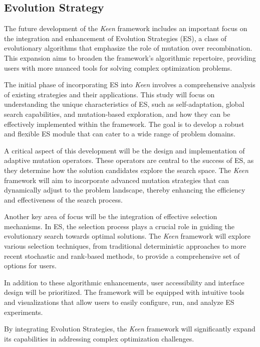     \subsection{Evolution Strategy}
    \label{sec:future:es}
        The future development of the \textit{Keen} framework includes an important focus on the integration and 
        enhancement of Evolution Strategies (ES), a class of evolutionary algorithms that emphasize the role of mutation 
        over recombination. This expansion aims to broaden the framework's algorithmic repertoire, providing users with 
        more nuanced tools for solving complex optimization problems.

        The initial phase of incorporating ES into \textit{Keen} involves a comprehensive analysis of existing 
        strategies and their applications. This study will focus on understanding the unique characteristics of ES, such 
        as self-adaptation, global search capabilities, and mutation-based exploration, and how they can be effectively 
        implemented within the framework. The goal is to develop a robust and flexible ES module that can cater to a 
        wide range of problem domains.

        A critical aspect of this development will be the design and implementation of adaptive mutation operators. 
        These operators are central to the success of ES, as they determine how the solution candidates explore the 
        search space. The \textit{Keen} framework will aim to incorporate advanced mutation strategies that can 
        dynamically adjust to the problem landscape, thereby enhancing the efficiency and effectiveness of the search 
        process.

        Another key area of focus will be the integration of effective selection mechanisms. In ES, the selection 
        process plays a crucial role in guiding the evolutionary search towards optimal solutions. The \textit{Keen} 
        framework will explore various selection techniques, from traditional deterministic approaches to more recent 
        stochastic and rank-based methods, to provide a comprehensive set of options for users.

        In addition to these algorithmic enhancements, user accessibility and interface design will be prioritized. The 
        framework will be equipped with intuitive tools and visualizations that allow users to easily configure, run, 
        and analyze ES experiments.

        By integrating Evolution Strategies, the \textit{Keen} framework will significantly expand its capabilities in 
        addressing complex optimization challenges.

